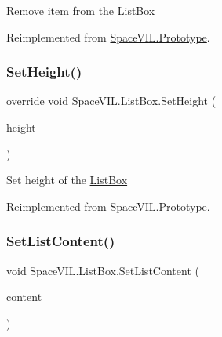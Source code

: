 Remove item from the \mbox{\hyperlink{class_space_v_i_l_1_1_list_box}{List\+Box}} 



Reimplemented from \mbox{\hyperlink{class_space_v_i_l_1_1_prototype_a7a2aabccfe6389f71d0265fa73f0ae87}{Space\+V\+I\+L.\+Prototype}}.

\mbox{\label{class_space_v_i_l_1_1_list_box_a5b44bd011e83b56053b529cf55253296}} 
\subsubsection{\texorpdfstring{Set\+Height()}{SetHeight()}}
{\footnotesize\ttfamily override void Space\+V\+I\+L.\+List\+Box.\+Set\+Height (\begin{DoxyParamCaption}\item[{int}]{height }\end{DoxyParamCaption})\hspace{0.3cm}{\ttfamily [virtual]}}



Set height of the \mbox{\hyperlink{class_space_v_i_l_1_1_list_box}{List\+Box}} 



Reimplemented from \mbox{\hyperlink{class_space_v_i_l_1_1_prototype_adc0adcbd1c3800d9525798ba7be5832a}{Space\+V\+I\+L.\+Prototype}}.

\mbox{\label{class_space_v_i_l_1_1_list_box_a792815a7711ae04ad8ea461b2685615e}} 
\subsubsection{\texorpdfstring{Set\+List\+Content()}{SetListContent()}}
{\footnotesize\ttfamily void Space\+V\+I\+L.\+List\+Box.\+Set\+List\+Content (\begin{DoxyParamCaption}\item[{List$<$ \mbox{\hyperlink{interface_space_v_i_l_1_1_core_1_1_i_base_item}{I\+Base\+Item}} $>$}]{content }\end{DoxyParamCaption})}



